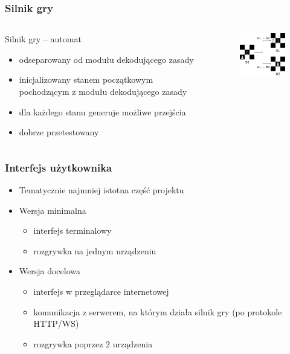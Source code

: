 \documentclass{beamer}
\begin{document}
\begin{frame}
	\frametitle{Silnik gry}
	\begin{columns}
		\begin{column}{.50\textwidth}
			Silnik gry -- automat
			\begin{itemize}
				\item odseparowany od modułu dekodującego zasady
				\item inicjalizowany stanem początkowym pochodzącym z modułu dekodującego zasady
				\item dla każdego stanu generuje możliwe przejścia
				\item dobrze przetestowany
			\end{itemize}
		\end{column}%
		\hfill
		\begin{column}{.50\textwidth}
			\begin{figure}
				\includegraphics[width=4.5cm]{stany.png}
				\centering
			\end{figure}
		\end{column}
	\end{columns}
\end{frame}

\begin{frame}
	\frametitle{Interfejs użytkownika}
	\begin{itemize}
		\item Tematycznie najmniej istotna część projektu
		\item Wersja minimalna
		      \begin{itemize}
			      \item interfejs terminalowy
			      \item rozgrywka na jednym urządzeniu
		      \end{itemize}
		\item Wersja docelowa
		      \begin{itemize}
			      \item interfejs w przeglądarce internetowej
			      \item komunikacja z serwerem, na którym działa silnik gry (po protokole HTTP/WS)
			      \item rozgrywka poprzez 2 urządzenia
		      \end{itemize}
	\end{itemize}
\end{frame}
\end{document}

